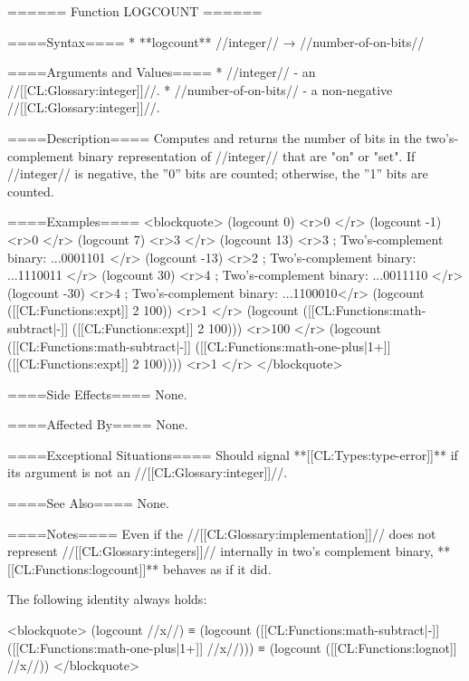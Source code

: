 ====== Function LOGCOUNT ======

====Syntax====
  * **logcount** //integer// → //number-of-on-bits//

====Arguments and Values====
  * //integer// - an //[[CL:Glossary:integer]]//.
  * //number-of-on-bits// - a non-negative //[[CL:Glossary:integer]]//.

====Description====
Computes and returns the number of bits in the two's-complement binary representation of //integer// that are "on" or "set". If //integer// is negative, the ''0'' bits are counted; otherwise, the ''1'' bits are counted.

====Examples====
<blockquote>
(logcount 0) <r>0 </r>
(logcount -1) <r>0 </r>
(logcount 7) <r>3 </r>
(logcount 13) <r>3 ; Two's-complement binary: ...0001101 </r>
(logcount -13) <r>2 ; Two's-complement binary: ...1110011 </r>
(logcount 30) <r>4 ; Two's-complement binary: ...0011110 </r>
(logcount -30) <r>4 ; Two's-complement binary: ...1100010</r>
(logcount ([[CL:Functions:expt]] 2 100)) <r>1 </r>
(logcount ([[CL:Functions:math-subtract|-]] ([[CL:Functions:expt]] 2 100))) <r>100 </r>
(logcount ([[CL:Functions:math-subtract|-]] ([[CL:Functions:math-one-plus|1+]] ([[CL:Functions:expt]] 2 100)))) <r>1 </r>
</blockquote>

====Side Effects====
None.

====Affected By====
None.

====Exceptional Situations====
Should signal **[[CL:Types:type-error]]** if its argument is not an //[[CL:Glossary:integer]]//.

====See Also====
None.

====Notes====
Even if the //[[CL:Glossary:implementation]]// does not represent //[[CL:Glossary:integers]]// internally in two's complement binary, **[[CL:Functions:logcount]]** behaves as if it did.

The following identity always holds:

<blockquote> 
(logcount //x//) 
  ≡ (logcount ([[CL:Functions:math-subtract|-]] ([[CL:Functions:math-one-plus|1+]] //x//))) 
  ≡ (logcount ([[CL:Functions:lognot]] //x//)) 
</blockquote>

